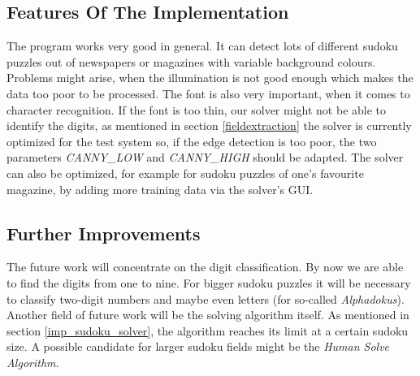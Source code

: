 \documentclass[
a4paper,     %
12pt         %
]{scrartcl}  %
\begin{document}
\subsection{Features Of The Implementation}
The program works very good in general. It can detect lots of different sudoku puzzles out of newspapers or magazines with variable background colours.
Problems might arise, when the illumination is not good enough which makes the data too poor to be processed. The font is also very important,
when it comes to character recognition. If the font is too thin, our solver might not be able to identify the digits, as mentioned in section 
\ref{fieldextraction} the solver is currently optimized for the test system so, if the edge detection is too poor, 
the two parameters \emph{CANNY\_LOW} and \emph{CANNY\_HIGH} should be adapted. The solver can also be optimized, for example for sudoku puzzles
of one's favourite magazine, by adding more training data via the solver's GUI.

\subsection{Further Improvements}
The future work will concentrate on the digit classification. By now we are able to find the digits from one to nine. For bigger sudoku puzzles
it will be necessary to classify two-digit numbers and maybe even letters (for so-called \emph{Alphadokus}). Another field of future work will
be the solving algorithm itself. As mentioned in section \ref{imp_sudoku_solver}, the algorithm reaches its limit at a certain sudoku size. A 
possible candidate for larger sudoku fields might be the \emph{Human Solve Algorithm}.




% 

% 
\end{document}
